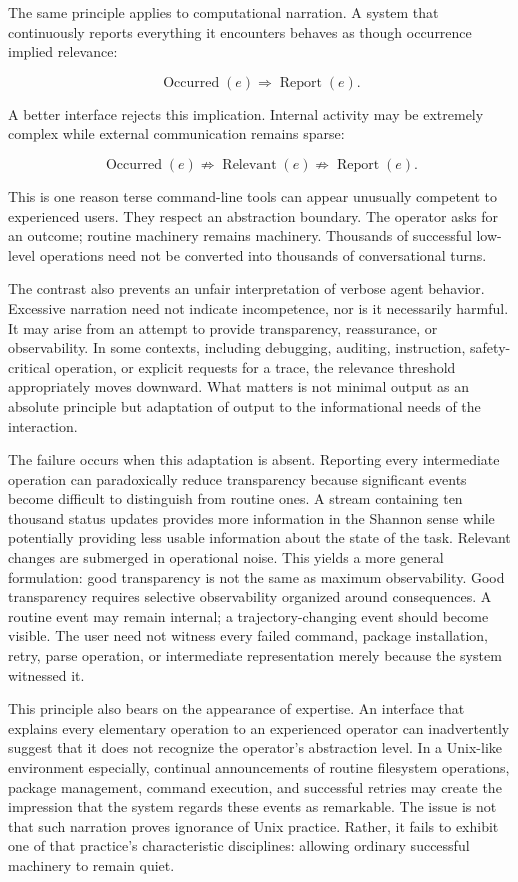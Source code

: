 \documentclass[11pt]{article}
\begin{document}
The same principle applies to computational narration. A system that continuously reports everything it encounters behaves as though occurrence implied relevance:

\[
\operatorname{Occurred}(e) \Rightarrow \operatorname{Report}(e).
\]

A better interface rejects this implication. Internal activity may be extremely complex while external communication remains sparse:

\[
\operatorname{Occurred}(e) \not\Rightarrow \operatorname{Relevant}(e) \not\Rightarrow \operatorname{Report}(e).
\]

This is one reason terse command-line tools can appear unusually competent to experienced users. They respect an abstraction boundary. The operator asks for an outcome; routine machinery remains machinery. Thousands of successful low-level operations need not be converted into thousands of conversational turns.

The contrast also prevents an unfair interpretation of verbose agent behavior. Excessive narration need not indicate incompetence, nor is it necessarily harmful. It may arise from an attempt to provide transparency, reassurance, or observability. In some contexts, including debugging, auditing, instruction, safety-critical operation, or explicit requests for a trace, the relevance threshold appropriately moves downward. What matters is not minimal output as an absolute principle but adaptation of output to the informational needs of the interaction.

The failure occurs when this adaptation is absent. Reporting every intermediate operation can paradoxically reduce transparency because significant events become difficult to distinguish from routine ones. A stream containing ten thousand status updates provides more information in the Shannon sense while potentially providing less usable information about the state of the task. Relevant changes are submerged in operational noise. This yields a more general formulation: good transparency is not the same as maximum observability. Good transparency requires selective observability organized around consequences. A routine event may remain internal; a trajectory-changing event should become visible. The user need not witness every failed command, package installation, retry, parse operation, or intermediate representation merely because the system witnessed it.

This principle also bears on the appearance of expertise. An interface that explains every elementary operation to an experienced operator can inadvertently suggest that it does not recognize the operator's abstraction level. In a Unix-like environment especially, continual announcements of routine filesystem operations, package management, command execution, and successful retries may create the impression that the system regards these events as remarkable. The issue is not that such narration proves ignorance of Unix practice. Rather, it fails to exhibit one of that practice's characteristic disciplines: allowing ordinary successful machinery to remain quiet.
\end{document}
